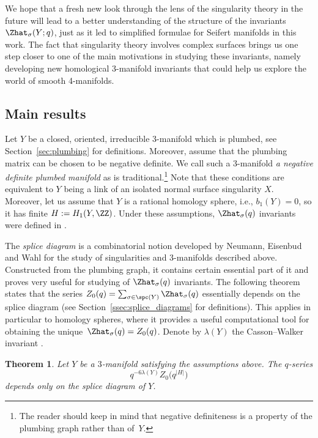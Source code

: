 \documentclass[10pt,a4paper]{amsart}
\newtheorem{Theorem}{Theorem}[section]
\begin{document}
We hope that a fresh new look through the lens of the singularity theory in the future will lead to a better understanding of the structure of the invariants $\Zhat_{\sigma}(Y; q)$, just as it led to simplified formulae for Seifert manifolds in this work. The fact that singularity theory involves complex surfaces brings us one step closer to one of the main motivations in studying these invariants, namely developing new homological 3-manifold invariants that could help us explore the world of smooth 4-manifolds.

\subsection{Main results}\label{ss:main_results}

Let $Y$ be a closed, oriented, irreducible 3-manifold which is plumbed, see Section~\ref{sec:plumbing} for definitions. Moreover, assume that the plumbing matrix can be chosen to be negative definite. We call such a 3-manifold \emph{a negative definite plumbed manifold} as is traditional.\footnote{The reader should keep in mind that negative definiteness is a property of the plumbing graph rather than of~$Y$.} Note that these conditions are equivalent to $Y$ being a link of an isolated normal surface singularity $X$. Moreover, let us assume that $Y$ is a rational homology sphere, i.e., $b_1(Y)=0$, so it has finite $H:=H_1(Y,\ZZ)$. Under these assumptions, $\Zhat_\sigma(q)$ invariants were defined in \cite{GPPV20}.

The \emph{splice diagram} is a combinatorial notion developed by Neumann, Eisenbud and Wahl \mbox{\cite{EN86, NW05a}} for the study of singularities and 3-manifolds described above. Constructed from the plumbing graph, it contains certain essential part of it and proves very useful for studying of $\Zhat_\sigma(q)$ invariants. The following theorem states that the series $Z_0(q) = \sum_{\sigma \in \spc(Y)}{\Zhat_\sigma(q)}$ essentially depends on the splice diagram (see Section~\ref{ssec:splice_diagrams} for definitions). This applies in particular to homology spheres, where it provides a useful computational tool for obtaining the unique~${\Zhat_\sigma(q) = Z_0(q)}$. Denote by $\lambda(Y)$ the Casson--Walker invariant \cite{Wa92}.

\begin{Theorem}
	Let $Y$ be a $3$-manifold satisfying the assumptions above. The $q$-series
	\begin{equation}
		q^{-6 \lambda(Y)} Z_{0}\bigl(q^{|H|}\bigr)
	\end{equation}
	depends only on the splice diagram of $Y$.
\end{Theorem}
\end{document}
